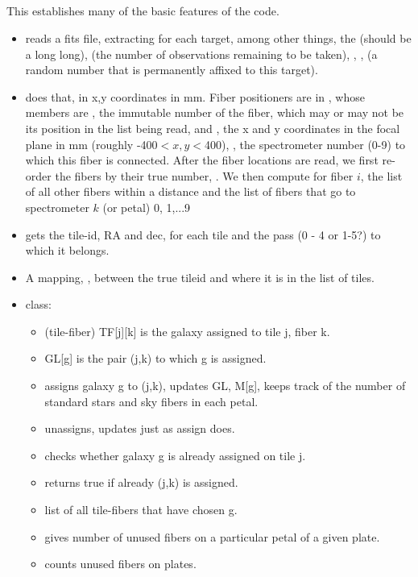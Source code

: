 \documentclass[12pt]{article}
\begin{document}
\subsection{}
This establishes many of the basic features of the code.
\begin{itemize}
\item {} reads a fits file, extracting for each target, among other things,  the  (should be a long long), (the number of observations remaining to be taken), ,  ,  (a random number that is permanently affixed to this target).
\item {} does that, in x,y coordinates in mm. Fiber positioners are in , whose members are , the immutable number of the fiber, which may or may not be its position in the list being read,  and , the x and y coordinates in the focal plane in mm (roughly -400$<x,y<$400), , the spectrometer number (0-9) to which this fiber is connected.  After the fiber locations are read, we first re-order the fibers by their true number, .  We then compute 
  for fiber $i$, the list of all other fibers within a distance  and
the  list  of fibers that go to spectrometer $k$ (or petal) 0, 1,...9
\item {} gets the tile-id,  RA and dec, for each tile and the pass (0 - 4 or 1-5?) to which it
 belongs.
 \item A mapping, , between the true tileid and where it is in the list of tiles.

 \item {} class:
 	\begin{itemize}
 	\item {} (tile-fiber)  TF[j][k] is the galaxy assigned to tile j, fiber k.
	\item {} GL[g] is the pair (j,k) to which g is assigned.
	\item {} assigns galaxy g to (j,k), updates GL, M[g], keeps track of the number of standard stars and sky fibers in each petal.
	\item {} unassigns, updates just as assign does.	
	\item {} checks whether galaxy g is already assigned on tile j.
	\item {} returns true if already (j,k) is assigned.
	\item {} list of all tile-fibers that have chosen g.
	\item {} gives number of unused fibers on a particular petal of a given plate.
	\item {} counts unused fibers on plates.


\end{itemize}
\end{itemize}
\end{document}

